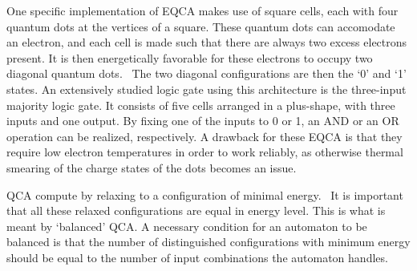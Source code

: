 \documentclass[10pt,a4paper]{article}
\begin{document}
One specific implementation of EQCA makes use of square cells, each with four quantum dots at the vertices of a square. These quantum dots can accomodate an electron, and each cell is made such that there are always two excess electrons present. It is then energetically favorable for these electrons to occupy two diagonal quantum dots.~\cite{QCA_DigitalLogicGate} The two diagonal configurations are then the `0' and `1' states. An extensively studied logic gate using this architecture is the three-input majority logic gate. It consists of five cells arranged in a plus-shape, with three inputs and one output. By fixing one of the inputs to 0 or 1, an AND or an OR operation can be realized, respectively. A drawback for these EQCA is that they require low electron temperatures in order to work reliably, as otherwise thermal smearing of the charge states of the dots becomes an issue.~\cite{QCA_DigitalLogicGate} \par
QCA compute by relaxing to a configuration of minimal energy.~\cite{QCA_Algorithms} It is important that all these relaxed configurations are equal in energy level. This is what is meant by `balanced' QCA. A necessary condition for an automaton to be balanced is that the number of distinguished configurations with minimum energy should be equal to the number of input combinations the automaton handles.~\cite{QCA_Algorithms}
\end{document}
